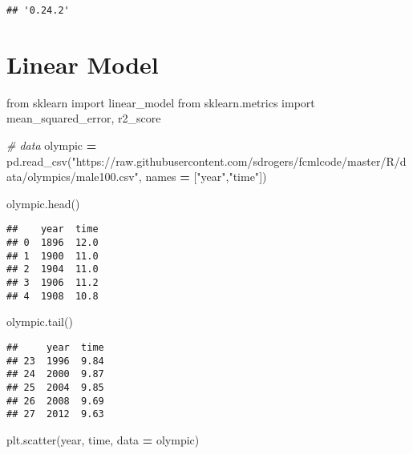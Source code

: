\documentclass[
]{book}
\newenvironment{Shaded}{\begin{snugshade}}{\end{snugshade}}
\newcommand{\CommentTok}[1]{\textcolor[rgb]{0.56,0.35,0.01}{\textit{#1}}}
\newcommand{\ImportTok}[1]{#1}
\newcommand{\NormalTok}[1]{#1}
\newcommand{\OperatorTok}[1]{\textcolor[rgb]{0.81,0.36,0.00}{\textbf{#1}}}
\newcommand{\StringTok}[1]{\textcolor[rgb]{0.31,0.60,0.02}{#1}}
\begin{document}
\begin{verbatim}
## '0.24.2'
\end{verbatim}

\hypertarget{linear-model}{%
\section{Linear Model}\label{linear-model}}

\begin{Shaded}
\begin{Highlighting}[]
\ImportTok{from}\NormalTok{ sklearn }\ImportTok{import}\NormalTok{ linear\_model}
\ImportTok{from}\NormalTok{ sklearn.metrics }\ImportTok{import}\NormalTok{ mean\_squared\_error, r2\_score}
\end{Highlighting}
\end{Shaded}

\begin{Shaded}
\begin{Highlighting}[]
\CommentTok{\# data}
\NormalTok{olympic }\OperatorTok{=}\NormalTok{ pd.read\_csv(}\StringTok{"https://raw.githubusercontent.com/sdrogers/fcmlcode/master/R/data/olympics/male100.csv"}\NormalTok{, names }\OperatorTok{=}\NormalTok{ [}\StringTok{"year"}\NormalTok{,}\StringTok{"time"}\NormalTok{])}
\end{Highlighting}
\end{Shaded}

\begin{Shaded}
\begin{Highlighting}[]
\NormalTok{olympic.head()}
\end{Highlighting}
\end{Shaded}

\begin{verbatim}
##    year  time
## 0  1896  12.0
## 1  1900  11.0
## 2  1904  11.0
## 3  1906  11.2
## 4  1908  10.8
\end{verbatim}

\begin{Shaded}
\begin{Highlighting}[]
\NormalTok{olympic.tail()}
\end{Highlighting}
\end{Shaded}

\begin{verbatim}
##     year  time
## 23  1996  9.84
## 24  2000  9.87
## 25  2004  9.85
## 26  2008  9.69
## 27  2012  9.63
\end{verbatim}

\begin{Shaded}
\begin{Highlighting}[]
\NormalTok{plt.scatter(}\StringTok{\textquotesingle{}year\textquotesingle{}}\NormalTok{, }\StringTok{\textquotesingle{}time\textquotesingle{}}\NormalTok{, data }\OperatorTok{=}\NormalTok{ olympic)}
\end{Highlighting}
\end{Shaded}
\end{document}
